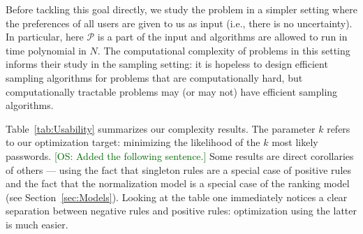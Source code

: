 \documentclass[prodmode,acmec]{ec-acmsmall}
\newcommand{\kibitz}[2]{\ifnum\Comments=1\textcolor{#1}{#2}\fi}
\newcommand{\os}[1]{\kibitz{darkgreen} {[OS: #1]}}
\newcommand{\PasswordSpace}{\mathcal{P}}
\begin{document}
{Before tackling this goal directly, we study the problem in a simpler setting where the preferences of all users are given to us as input (i.e., there is no uncertainty). In particular, here $\PasswordSpace$ is a part of the input and algorithms are allowed to run in time polynomial in $N$. The computational complexity of problems in this setting informs their study in the sampling setting: it is hopeless to design efficient sampling algorithms for problems that are computationally hard, but computationally tractable problems may (or may not) have efficient sampling algorithms. 

Table~\ref{tab:Usability} summarizes our complexity results. The parameter $k$ refers to our optimization target: minimizing the likelihood of the $k$ most likely passwords. \os{Added the following sentence.} Some results are direct corollaries of others --- using the fact that singleton rules are a special case of positive rules and the fact that the normalization model is a special case of the ranking model (see Section~\ref{sec:Models}). Looking at the table one immediately notices a clear separation between negative rules and positive rules: optimization using the latter is much easier. 

\renewcommand{\arraystretch}{1.3}
\renewcommand{\tabcolsep}{4pt}
\begin{table}[t]
\centering
\label{tab:Usability}
\end{table}

}
\end{document}
